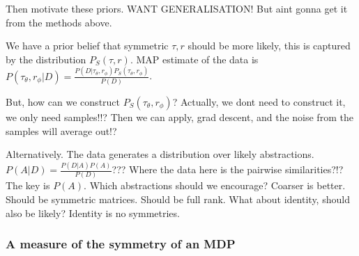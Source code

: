 Then motivate these priors. WANT GENERALISATION! But aint gonna get it from the
methods above.




We have a prior belief that symmetric $\tau, r$ should be more likely, this is captured by the distribution $P_S(\tau, r)$.
MAP estimate of the data is $P(\tau_{\theta}, r_{\phi}| D) = \frac{P(D | \tau_{\theta}, r_{\phi})P_S(\tau_{\theta}, r_{\phi})}{P(D)}$.

But, how can we construct $P_S(\tau_{\theta}, r_{\phi})$?
Actually, we dont need to construct it, we only need samples!!?
Then we can apply, grad descent, and the noise from the samples will average out!?


Alternatively. The data generates a distribution over likely abstractions.
$P(A|D) = \frac{P(D|A)P(A)}{P(D)}$??? Where the data here is the pairwise similarities?!?
The key is $P(A)$. Which abstractions should we encourage? Coarser is better.
Should be symmetric matrices. Should be full rank. What about identity, should also be likely?
Identity is no symmetries.

%
%
%
%
%
%


\subsubsection{A measure of the symmetry of an MDP}


